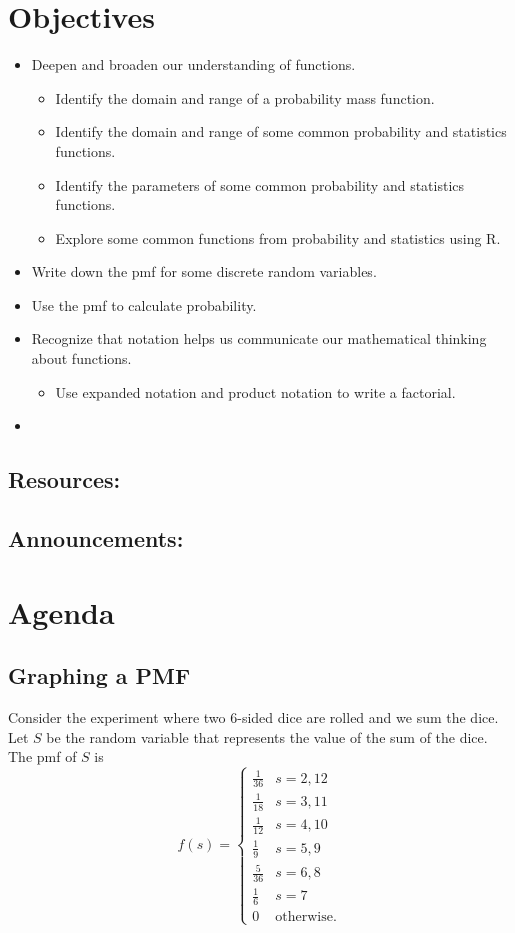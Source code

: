 \documentclass{article}
\theoremstyle{plain}
\theoremstyle{box}
\begin{document}
\section{Objectives}
\begin{itemize}
\item Deepen and broaden our understanding of functions.
	\begin{itemize}
	\item Identify the domain and range of a probability mass function.
	\item Identify the domain and range of some common probability and statistics functions.
	\item Identify the parameters of some common probability and statistics functions.
	\item Explore some common functions from probability and statistics using R.
	\end{itemize}
\item Write down the pmf for some discrete random variables.
\item Use the pmf to calculate probability.
\item Recognize that notation helps us communicate our mathematical thinking about functions.
	\begin{itemize}
	\item Use expanded notation and product notation to write a factorial.
	\end{itemize}
\item 
\end{itemize}
\subsection{Resources:}
\subsection{Announcements:}



\newpage
\section{Agenda}
\subsection{Graphing a PMF}
Consider the experiment where two 6-sided dice are rolled and we sum the dice. Let $S$ be the random variable that represents the value of the sum of the dice. The pmf of $S$ is
      $$f(s) = 
    \begin{cases}
    \frac{1}{36} & s=2,12 \\
    \frac{1}{18} & s=3,11 \\
    \frac{1}{12} & s=4,10 \\
    \frac{1}{9} & s=5,9 \\
    \frac{5}{36} & s=6,8 \\
    \frac{1}{6} & s=7 \\
    0 & \text{otherwise}.
    \end{cases}$$
\end{document}
